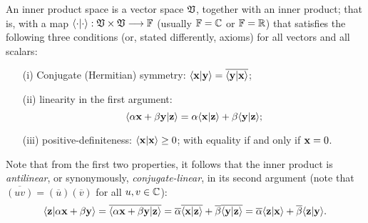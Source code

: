 An inner product space is a vector space $\frak V$,
together with an inner product; that is, with a map
 $\langle \cdot \vert \cdot \rangle :  \frak V  \times  \frak V  \longrightarrow {\Bbb F}$
 (usually ${\Bbb F}={\Bbb C}$ or ${\Bbb F}={\Bbb R}$)
 that satisfies the following three conditions (or, stated differently, axioms) for all vectors  and all scalars:
\begin{itemize}
\item[(i)]
Conjugate (Hermitian) symmetry:
$
\langle {\bf x}\vert {\bf y}\rangle
=
\overline{\langle {\bf y}\vert {\bf x}\rangle }$;
\item[(ii)]
linearity in the first argument:
$$
\langle  \alpha{\bf x} + \beta {\bf y}  \vert {\bf z}\rangle
=
\alpha {\langle {\bf x}\vert {\bf z}\rangle}
+
\beta {\langle {\bf y}\vert {\bf z}\rangle}
;
$$
\item[(iii)]
\label{2016-m-ch-fdvs-pd}
positive-definiteness:
$
\langle {\bf x}\vert {\bf x}\rangle
\ge
0$;  with equality if and only if ${\bf x} = 0$.
\end{itemize}

Note that from the first two properties, it follows that the inner product is
{\em antilinear}, or synonymously,
{\em conjugate-linear}, in its second argument (note that $\overline{(uv)}=(\overline{u}) (\overline{v})$ for all $u,v\in {\Bbb C}$):
\begin{equation}
\begin{split}
 \langle  {\bf z} \vert \alpha {\bf x} + \beta {\bf y} \rangle
 =
 \overline{\langle \alpha {\bf x} + \beta {\bf y} \vert  {\bf z} \rangle }
 =
 \overline{ \alpha}\overline{\langle {\bf x} \vert  {\bf z}\rangle}
 + \overline{\beta }\overline{\langle {\bf y} \vert  {\bf z}\rangle}
 =
 \overline{\alpha} {\langle {\bf z}\vert {\bf x}\rangle}
 +\overline{\beta} {\langle {\bf z}\vert {\bf y}\rangle}
.
\end{split}
\end{equation}




